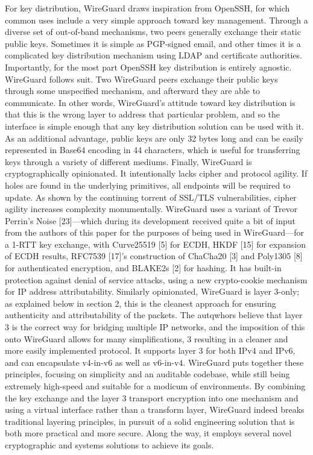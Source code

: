 For key distribution, WireGuard draws inspiration from OpenSSH, for which common uses include a very simple approach toward key management. Through a diverse set of out-of-band mechanisms, two peers generally exchange their static public keys. Sometimes it is simple as PGP-signed email, and other times it is a complicated key distribution mechanism using LDAP and certificate authorities. Importantly, for the most part OpenSSH key distribution is entirely agnostic. WireGuard follows suit. Two WireGuard peers exchange their public keys through some unspecified mechanism, and afterward they are able to communicate. In other words, WireGuard's attitude toward key distribution is that this is the wrong layer to address that particular problem, and so the interface is simple enough that any key distribution solution can be used with it. As an additional advantage, public keys are only 32 bytes long and can be easily represented in Base64 encoding in 44 characters, which is useful for transferring keys through a variety of different mediums.
Finally, WireGuard is cryptographically opinionated. It intentionally lacks cipher and protocol agility. If holes are found in the underlying primitives, all endpoints will be required to update. As shown by the continuing torrent of SSL/TLS vulnerabilities, cipher agility increases complexity monumentally. WireGuard uses a variant of Trevor Perrin's Noise [23]—which during its development received quite a bit of input from the authors of this paper for the purposes of being used in WireGuard—for a 1-RTT key exchange, with Curve25519 [5] for ECDH, HKDF [15] for expansion of ECDH results, RFC7539 [17]'s construction of ChaCha20 [3] and Poly1305 [8] for authenticated encryption, and BLAKE2s [2] for hashing. It has built-in protection against denial of service attacks, using a new crypto-cookie mechanism for IP address attributability.
Similarly opinionated, WireGuard is layer 3-only; as explained below in section 2, this is the cleanest approach for ensuring authenticity and attributability of the packets. The autqwhors believe that layer 3 is the correct way for bridging multiple IP networks, and the imposition of this onto WireGuard allows for many simplifications,
3
resulting in a cleaner and more easily implemented protocol. It supports layer 3 for both IPv4 and IPv6, and can encapsulate v4-in-v6 as well as v6-in-v4.
WireGuard puts together these principles, focusing on simplicity and an auditable codebase, while still being extremely high-speed and suitable for a modicum of environments. By combining the key exchange and the layer 3 transport encryption into one mechanism and using a virtual interface rather than a transform layer, WireGuard indeed breaks traditional layering principles, in pursuit of a solid engineering solution that is both more practical and more secure. Along the way, it employs several novel cryptographic and systems solutions to achieve its goals.

